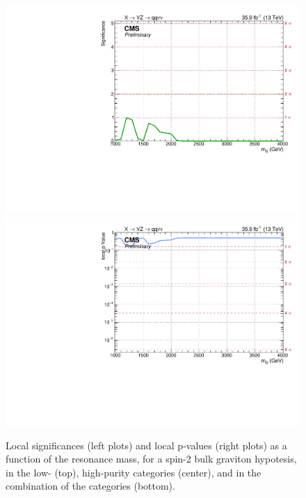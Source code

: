 \begin{figure}[!htb]
\begin{center}
     \includegraphics[width=.495\textwidth]{v9/plotsAlpha/Limits/Significance_XZZInv_XVZnn.pdf}%
     \includegraphics[width=.495\textwidth]{v9/plotsAlpha/Limits/pValue_XZZInv_XVZnn.pdf}

  \end{center}
  \caption{Local significances (left plots) and local p-values (right plots) as a function of the resonance mass, for a spin-2 bulk graviton hypotesis, in the low- (top), high-purity categories (center), and in the combination of the categories (bottom).}
  \label{fig:Signif_XZZInv}
\end{figure}

